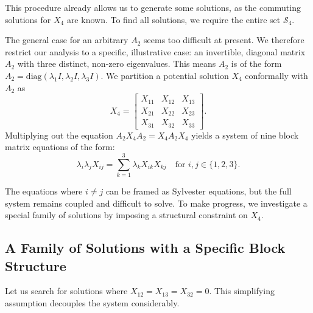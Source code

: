 \documentclass{article}
\begin{document}

This procedure already allows us to generate some solutions, as the commuting solutions for $X_4$ are known. To find all solutions, we require the entire set $\mathcal{S}_4$.

The general case for an arbitrary $A_2$ seems too difficult at present. We therefore restrict our analysis to a specific, illustrative case: an invertible, diagonal matrix $A_2$ with three distinct, non-zero eigenvalues. This means $A_2$ is of the form $A_2 = \text{diag}(\lambda_1 I, \lambda_2 I, \lambda_3 I)$. We partition a potential solution $X_4$ conformally with $A_2$ as 
\[
X_4 = 
\begin{bmatrix}
    X_{11} & X_{12} & X_{13} \\
    X_{21} & X_{22} & X_{23} \\
    X_{31} & X_{32} & X_{33}
\end{bmatrix}.
\]
Multiplying out the equation $A_2 X_4 A_2 = X_4 A_2 X_4$ yields a system of nine block matrix equations of the form:
\[
\lambda_i \lambda_j X_{ij} = \sum_{k = 1}^{3} \lambda_k X_{ik} X_{kj} \quad \text{for } i, j \in \{1, 2, 3\}.
\]

The equations where $i \neq j$ can be framed as Sylvester equations, but the full system remains coupled and difficult to solve. To make progress, we investigate a special family of solutions by imposing a structural constraint on $X_4$.

\subsection*{A Family of Solutions with a Specific Block Structure}

Let us search for solutions where $X_{12} = X_{13} = X_{32} = 0$. This simplifying assumption decouples the system considerably.
\end{document}
